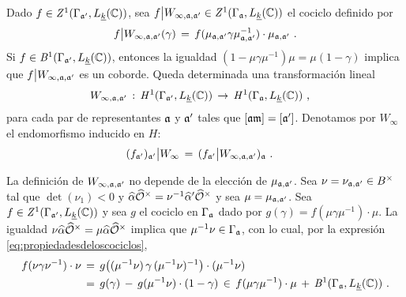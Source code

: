 %
Dado $f\in\cociclos[1]{\Gamma_{\frak{a}'},L_{\peso{k}}(\bb{C})}$, sea
\begin{math}
	f\big\vert W_{\infty,\frak{a},\frak{a}'}\in
		\cociclos[1]{\Gamma_{\frak{a}},L_{\peso{k}}(\bb{C})}
\end{math}
el cociclo definido por
\begin{equation}
	\label{eq:involucionencomponentesmetodos}
	f\big\vert W_{\infty,\frak{a},\frak{a}'}(\gamma) \,=\,
		f(\mu_{\frak{a},\frak{a}'}\gamma\mu_{\frak{a},\frak{a}'}^{-1}
			)\cdot\mu_{\frak{a},\frak{a}'}
	\text{ .}
\end{equation}
%
Si $f\in\cobordes[1]{\Gamma_{\frak{a}'},L_{\peso{k}}(\bb{C})}$, entonces la
igualdad $(1-\mu\gamma\mu^{-1})\mu=\mu(1-\gamma)$ implica que
$f\big\vert W_{\infty,\frak{a},\frak{a}'}$ es un coborde. Queda determinada una
transformaci\'{o}n lineal
\begin{align*}
	& W_{\infty,\frak{a},\frak{a}'} \,:\,
		\cohomolo[1]{\Gamma_{\frak{a}'},L_{\peso{k}}(\bb{C})}
			\,\rightarrow\,
		\cohomolo[1]{\Gamma_{\frak{a}},L_{\peso{k}}(\bb{C})}
	\text{ ,}
\end{align*}
%
para cada par de representantes $\frak{a}$ y $\frak{a}'$ tales que
$[\frak{a}\frak{m}]=[\frak{a}']$. Denotamos por $W_{\infty}$ el endomorfismo
inducido en $H$:
\begin{align*}
	(f_{\frak{a}'})_{\frak{a}'}\big\vert W_{\infty} & \,=\,
		(f_{\frak{a}'}\big\vert W_{\infty,\frak{a},\frak{a}'}
			)_{\frak{a}}
	\text{ .}
\end{align*}
%

\begin{obsInvolucionNoDependeDeMuCohomologia}%
	\label{obs:involucionnodependedemucohomologia}
	La definici\'{o}n de $W_{\infty,\frak{a},\frak{a}'}$ no depende de la
	elecci\'{o}n de $\mu_{\frak{a},\frak{a}'}$. Sea
	$\nu=\nu_{\frak{a},\frak{a}'}\in B^{\times}$ tal que $\det(\nu_{1})<0$
	y
	\begin{math}
		\hhat{\alpha}\Idfin{\cal{O}}=
			\nu^{-1}\hhat{\alpha}'\Idfin{\cal{O}}
	\end{math}
	y sea $\mu=\mu_{\frak{a},\frak{a}'}$. Sea
	$f\in\cociclos[1]{\Gamma_{\frak{a}'},L_{\peso{k}}(\bb{C})}$ y sea
	$g$ el cociclo en $\Gamma_{\frak{a}}$ dado por
	$g(\gamma)=f(\mu\gamma\mu^{-1})\cdot\mu$. La igualdad
	$\nu\hhat{\alpha}\Idfin{\cal{O}}=\mu\hhat{\alpha}\Idfin{\cal{O}}$
	implica que $\mu^{-1}\nu\in\Gamma_{\frak{a}}$, con lo cual, por
	la expresi\'{o}n \eqref{eq:propiedadesdeloscociclos},
	\begin{align*}
		f(\nu\gamma\nu^{-1})\cdot\nu & \,=\,
			g\big((\mu^{-1}\nu)\,\gamma\,(\mu^{-1}\nu)^{-1}\big)
				\cdot (\mu^{-1}\nu) \\
		& \,=\,g(\gamma)\,-\,g(\mu^{-1}\nu)\cdot(1-\gamma)\,\in\,
			f(\mu\gamma\mu^{-1})\cdot\mu\,+\,
			\cobordes[1]{\Gamma_{\frak{a}},L_{\peso{k}}(\bb{C})}
		\text{ .}
	\end{align*}
\end{obsInvolucionNoDependeDeMuCohomologia}

